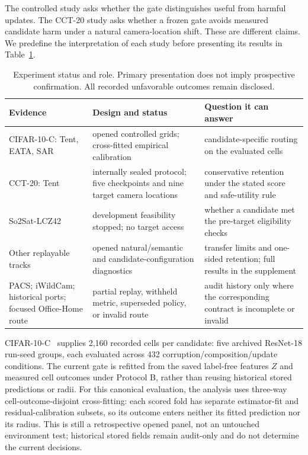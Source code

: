 The controlled study asks whether the gate distinguishes useful from harmful updates.
The CCT-20 study asks whether a frozen gate avoids measured candidate harm under a natural
camera-location shift. These are different claims. We predefine the interpretation of each study
before presenting its results in Table~\ref{tab:compact-taxonomy}.

\begin{table}[t]
\centering
\footnotesize
\caption{Experiment status and role. Primary presentation does not imply prospective confirmation.
All recorded unfavorable outcomes remain disclosed.}
\label{tab:compact-taxonomy}
\begin{tabular}{@{}p{}p{}p{}@{}}
\toprule
Evidence & Design and status & Question it can answer \\
\midrule
CIFAR-10-C: Tent, EATA, SAR & opened controlled grids; cross-fitted empirical calibration & candidate-specific routing on the evaluated cells \\
CCT-20: Tent & internally sealed protocol; five checkpoints and nine target camera locations & conservative retention under the stated score and safe-utility rule \\
So2Sat-LCZ42 & development feasibility stopped; no target access & whether a candidate met the pre-target eligibility checks \\
Other replayable tracks & opened natural/semantic and candidate-configuration diagnostics & transfer limits and one-sided retention; full results in the supplement \\
PACS; iWildCam; historical ports; focused Office-Home route & partial replay, withheld metric, superseded policy, or invalid route & audit history only where the corresponding contract is incomplete or invalid \\
\bottomrule
\end{tabular}
\end{table}

CIFAR-10-C~\cite{hendrycks2019cifar10c} supplies 2,160 recorded cells per candidate: five
archived ResNet-18 run-seed groups, each evaluated across 432
corruption/composition/update conditions. The current gate is refitted from the saved label-free
features $Z$ and measured cell outcomes under Protocol B, rather than reusing historical stored
predictions or radii. For this canonical evaluation, the analysis uses three-way
cell-outcome-disjoint cross-fitting: each scored fold has separate estimator-fit and
residual-calibration subsets, so its outcome enters neither its fitted prediction nor its radius.
This is still a retrospective opened panel, not an untouched environment test; historical stored
fields remain audit-only and do not determine the current decisions.

